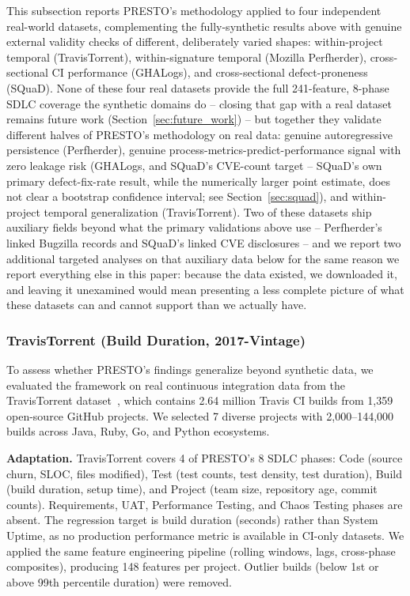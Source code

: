 \documentclass[technologies,article,submit,pdftex,moreauthors]{Definitions/mdpi}
\begin{document}
This subsection reports PRESTO's methodology applied to four independent
real-world datasets, complementing the fully-synthetic results above
with genuine external validity checks of different, deliberately varied
shapes: within-project temporal (TravisTorrent), within-signature
temporal (Mozilla Perfherder), cross-sectional CI performance (GHALogs),
and cross-sectional defect-proneness (SQuaD). None of these four real
datasets provide the full 241-feature, 8-phase SDLC coverage the
synthetic domains do -- closing that gap with a real dataset remains
future work (Section~\ref{sec:future_work}) -- but together they validate different halves
of PRESTO's methodology on real data: genuine autoregressive persistence
(Perfherder), genuine process-metrics-predict-performance signal with
zero leakage risk (GHALogs, and SQuaD's CVE-count target -- SQuaD's own
primary defect-fix-rate result, while the numerically larger point
estimate, does not clear a bootstrap confidence interval; see
Section~\ref{sec:squad}), and within-project temporal
generalization (TravisTorrent). Two of these datasets ship auxiliary
fields beyond what the primary validations above use -- Perfherder's
linked Bugzilla records and SQuaD's linked CVE disclosures -- and we
report two additional targeted analyses on that auxiliary data below
for the same reason we report everything else in this paper: because
the data existed, we downloaded it, and leaving it unexamined would
mean presenting a less complete picture of what these datasets can and
cannot support than we actually have.

\subsubsection{TravisTorrent (Build Duration,
2017-Vintage)}\label{sec:travistorrent}

To assess whether PRESTO's findings generalize beyond synthetic data, we
evaluated the framework on real continuous integration data from the
TravisTorrent dataset~\cite{beller2017travistorrent}, which contains
2.64 million Travis CI builds from 1,359 open-source GitHub projects. We
selected 7 diverse projects with 2,000--144,000 builds across Java,
Ruby, Go, and Python ecosystems.

\textbf{Adaptation.} TravisTorrent covers 4 of PRESTO's 8 SDLC phases:
Code (source churn, SLOC, files modified), Test (test counts, test
density, test duration), Build (build duration, setup time), and Project
(team size, repository age, commit counts). Requirements, UAT,
Performance Testing, and Chaos Testing phases are absent. The regression
target is build duration (seconds) rather than System Uptime, as no
production performance metric is available in CI-only datasets. We
applied the same feature engineering pipeline (rolling windows, lags,
cross-phase composites), producing 148 features per project. Outlier
builds (below 1st or above 99th percentile duration) were removed.
\end{document}

